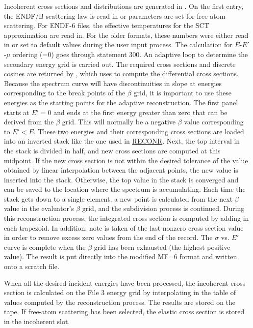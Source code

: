 Incoherent cross sections and distributions are generated in
.  On the first entry,
the ENDF/B scattering law is read in or parameters are set for
free-atom scattering.  For ENDF-6 files, the effective temperatures
for the SCT approximation are read in.  For the older formats, these
numbers were either read in or set to default values during the user
input process.  The calculation for $E$-$E'$-$\mu$ ordering (=0)
goes through statement 300. An adaptive loop to determine the
secondary energy grid is carried out.  The required cross sections and
discrete cosines are returned by ,
which uses  to compute the
differential cross sections.  Because the spectrum curve will
have discontinuities in slope at energies corresponding to the break points
of the $\beta$ grid, it is important to use these energies as the starting
points for the adaptive reconstruction.  The first panel starts at $E'=0$
and ends at the first energy greater than zero that can be derived from
the $\beta$ grid.  This will normally be a negative $\beta$ value
corresponding to $E'{<}E$.  These two energies and their corresponding
cross sections are loaded into an inverted stack like the one used in
\hyperlink{sRECONRhy}{RECONR}.  Next, the top interval in the
stack is divided in half, and new
cross sections are computed at this midpoint.  If the new cross section
is not within the desired tolerance of the value obtained by linear
interpolation between the adjacent points, the new value is inserted into
the stack.  Otherwise, the top value in the stack is converged and can be
saved to the location where the spectrum is accumulating.  Each time the
stack gets down to a single element, a new point is calculated from the
next $\beta$ value in the evaluator's $\beta$ grid, and the subdivision
process is continued.  During this reconstruction process, the integrated
cross section is computed by adding in each trapezoid.  In addition, note
is taken of the last nonzero cross section value in order to remove excess
zero values from the end of the record.  The $\sigma$ vs. $E'$ curve is
complete when the $\beta$ grid has been exhausted (the highest positive
value).  The result is put directly into the modified MF=6 format and
written onto a scratch file.

When all the desired incident energies have been processed, the incoherent
cross section is calculated on the File 3 energy grid by interpolating
in the table of values computed by the reconstruction process.  The
results are stored on the  tape.  If free-atom
scattering has been selected, the elastic cross section is stored in
the incoherent slot.

